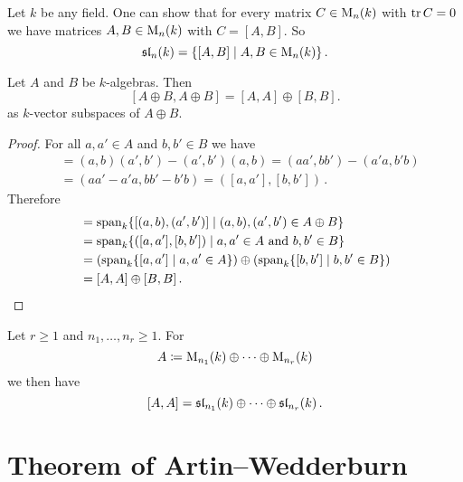 \begin{remark}
  Let $k$ be any field.
  One can show that for every matrix $C \in \operatorname{M}_n(k)$ with $\operatorname{tr} C = 0$ we have matrices $A, B \in \operatorname{M}_n(k)$ with $C = [A,B]$.
  So
  \[
      \operatorname{\mathfrak{sl}}_n(k)
    = \{
        [A,B]
      \mid
        A, B \in \operatorname{M}_n(k)
      \} \,.
  \]
\end{remark}


\begin{lemma}
  Let $A$ and $B$ be $k$-algebras. Then
  \[
      [A \oplus B, A \oplus B]
    = [A,A] \oplus [B,B].
  \]
  as $k$-vector subspaces of $A \oplus B$.
\end{lemma}
\begin{proof}
  For all $a, a' \in A$ and $b, b' \in B$ we have
  \begin{align*}
        [(a,b),(a',b')]
    &=  (a,b)(a',b') - (a',b')(a,b)
     =  (aa',bb') - (a'a, b'b) \\
    &=  (aa'-a'a, bb' - b'b)
     =  ([a,a'], [b,b']) \,.
  \end{align*}
  Therefore
  \begin{align*}
        [A \oplus B, A \oplus B]
    &=  \vspan_k  \{
                    [(a,b), (a',b')]
                  \mid
                    (a,b), (a',b') \in A \oplus B
                  \} \\
    &= \vspan_k \{
                  ([a,a'], [b,b'])
                \mid
                  a, a' \in A
                  \text{ and }
                  b, b' \in B
                \} \\
    &=  \left(
          \vspan_k \{ [a,a'] \mid a, a' \in A \}
        \right)
        \oplus
        \left(
          \vspan_k \{ [b,b'] \mid b, b' \in B \}
        \right) \\
    &= [A,A] \oplus [B,B] \,.
    \qedhere
  \end{align*}
\end{proof}


\begin{corollary}\label{corollary: commutator product of matrix algebras}
  Let $r \geq 1$ and $n_1, \dots, n_r \geq 1$. For
  \[
    A \coloneqq \operatorname{M}_{n_1}(k) \oplus \dotsb \oplus \operatorname{M}_{n_r}(k)
  \]
  we then have
  \[
      [A,A]
    = \operatorname{\mathfrak{sl}}_{n_1}(k) \oplus \dotsb \oplus \operatorname{\mathfrak{sl}}_{n_r}(k) \,.
  \]
\end{corollary}





\section{Theorem of Artin--Wedderburn}


